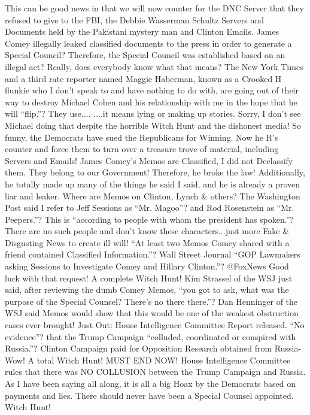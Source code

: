 This can be good news in that we will now counter for the DNC Server
that they refused to give to the FBI, the Debbie Wasserman Schultz
Servers and Documents held by the Pakistani mystery man and Clinton
Emails. James Comey illegally leaked classified documents to the press
in order to generate a Special Council? Therefore, the Special Council
was established based on an illegal act? Really, does everybody know
what that means? The New York Times and a third rate reporter named
Maggie Haberman, known as a Crooked H flunkie who I don't speak to and
have nothing to do with, are going out of their way to destroy Michael
Cohen and his relationship with me in the hope that he will ``flip.''?
They use.... ....it means lying or making up stories. Sorry, I don't see
Michael doing that despite the horrible Witch Hunt and the dishonest
media! So funny, the Democrats have sued the Republicans for Winning.
Now he R's counter and force them to turn over a treasure trove of
material, including Servers and Emails! James Comey's Memos are
Classified, I did not Declassify them. They belong to our Government!
Therefore, he broke the law! Additionally, he totally made up many of
the things he said I said, and he is already a proven liar and leaker.
Where are Memos on Clinton, Lynch \& others? The Washington Post said I
refer to Jeff Sessions as ``Mr. Magoo''? and Rod Rosenstein as ``Mr.
Peepers.''? This is ``according to people with whom the president has
spoken.''? There are no such people and don't know these
characters...just more Fake \& Disgusting News to create ill will! ``At
least two Memos Comey shared with a friend contained Classified
Information.''? Wall Street Journal ``GOP Lawmakers asking Sessions to
Investigate Comey and Hillary Clinton.''? @FoxNews Good luck with that
request! A complete Witch Hunt! Kim Strassel of the WSJ just said, after
reviewing the dumb Comey Memos, ``you got to ask, what was the purpose
of the Special Counsel? There's no there there.''? Dan Henninger of the
WSJ said Memos would show that this would be one of the weakest
obstruction cases ever brought! Just Out: House Intelligence Committee
Report released. ``No evidence''? that the Trump Campaign ``colluded,
coordinated or conspired with Russia.''? Clinton Campaign paid for
Opposition Research obtained from Russia- Wow! A total Witch Hunt! MUST
END NOW! House Intelligence Committee rules that there was NO COLLUSION
between the Trump Campaign and Russia. As I have been saying all along,
it is all a big Hoax by the Democrats based on payments and lies. There
should never have been a Special Counsel appointed. Witch Hunt!

